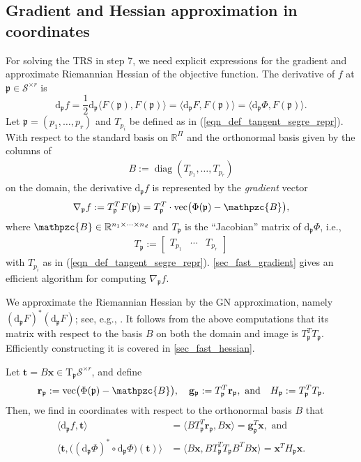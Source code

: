 \documentclass[a4paper,10pt,final]{siamart1116}
\newcommand{\tuple}[1]{\mathfrak{#1}}
\newcommand{\Var}[1]{\mathcal{#1}}
\newcommand{\tensor}[1]{\mathpzc{#1}}
\newcommand{\vect}[1]{\mathbf{#1}}
\newcommand{\Tang}[2]{\mathrm{T}_{#1} {#2}}
\newcommand{\deriv}[2]{\mathrm{d}_{#1}#2}
\newcommand{\R}{\mathbb{R}}
\newcommand{\refeqn}[1]{{(\ref{#1})}}
\newcommand{\refapp}[1]{{\cref{#1}}}
\numberwithin{equation}{section}
\numberwithin{figure}{section}
\numberwithin{table}{section}
\numberwithin{theorem}{section}
\begin{document}
\subsection{Gradient and Hessian approximation in coordinates} \label{sec_grad_hess_local_coords}
For solving the TRS in step 7, we need explicit expressions for the gradient and approximate Riemannian Hessian of the objective function. The derivative of $f$ at $\tuple{p} \in \Var{S}^{\times r}$ is
\[
 \deriv{\tuple{p}}{f} = \frac{1}{2} \deriv{\tuple{p}}{\langle F(\tuple{p}), F(\tuple{p})\rangle} = \langle \deriv{\tuple{p}}{F}, F(\tuple{p}) \rangle = \langle \deriv{\tuple{p}}{\Phi}, F(\tuple{p}) \rangle.
\]
Let $\tuple{p} = (p_1,\ldots,p_r)$ and $T_{p_i}$ be defined as in \refeqn{eqn_def_tangent_segre_repr}. With respect to the standard basis on $\R^\Pi$ and the orthonormal basis given by the columns of
\begin{align}\label{eqn_orth_basis}
 B := \operatorname{diag}(T_{p_1}, \ldots, T_{p_r})
\end{align}
on the domain, the derivative $\deriv{\tuple{p}}{f}$ is represented by the \emph{gradient} vector
\[
  \nabla_{\tuple{p}} f := T_{\tuple{p}}^T  F(\tuple{p}) = T_{\tuple{p}}^T \cdot \operatorname{vec}\bigl( \Phi(\tuple{p}) - \tensor{B} \bigr),
\]
where $\tensor{B} \in \R^{n_1 \times \cdots \times n_d}$ and {$T_{\tuple{p}}$ is the ``Jacobian'' matrix of $\deriv{\tuple{p}}{\Phi}$, i.e.,}
\begin{align} \label{eqn_jacobian}
 T_{\tuple{p}} := \begin{bmatrix} T_{p_1} & \cdots & T_{p_r} \end{bmatrix}
\end{align}
with $T_{p_i}$ as in \refeqn{eqn_def_tangent_segre_repr}. \refapp{sec_fast_gradient} gives an efficient algorithm for computing $\nabla_{\tuple{p}} f$.

We approximate the Riemannian Hessian by the GN approximation, namely $(\deriv{\tuple{p}}{F})^* (\deriv{\tuple{p}}{F})$; see, e.g., \cite[section 8.4]{AMS2008}. It follows from the above computations that its matrix with respect to the basis $B$ on both the domain and image is
\(
T_{\tuple{p}}^T T_{\tuple{p}}.
\)
Efficiently constructing it is covered in \refapp{sec_fast_hessian}.

Let $\vect{t} = B \vect{x} \in \Tang{\tuple{p}}{\Var{S}^{\times r}}$, {and define
\[
 \vect{r}_{\tuple{p}} := \operatorname{vec}\bigl( \Phi(\tuple{p}) - \tensor{B} \bigr), \quad
 \vect{g}_{\tuple{p}} := T_{\tuple{p}}^T \vect{r}_{\tuple{p}}, \text{ and} \quad
 H_{\tuple{p}} := T_{\tuple{p}}^T T_{\tuple{p}}.
\]}
Then, we find in coordinates with respect to the orthonormal basis $B$ that
\begin{align*}
\langle \deriv{\tuple{p}}{f}, \vect{t} \rangle &= \langle B T_{\tuple{p}}^T \vect{r}_{\tuple{p}}, B \vect{x} \rangle = \vect{g}_{\tuple{p}}^T \vect{x}, \text{ and } \\
\langle \vect{t}, \bigl( (\deriv{\tuple{p}}{\Phi})^* \circ \deriv{\tuple{p}}{\Phi}\bigr)( \vect{t} )\rangle &=
\langle B \vect{x}, B T_{\tuple{p}}^T T_{\tuple{p}} B^T B \vect{x} \rangle = \vect{x}^T H_{\tuple{p}} \vect{x}.
\end{align*}
\end{document}
